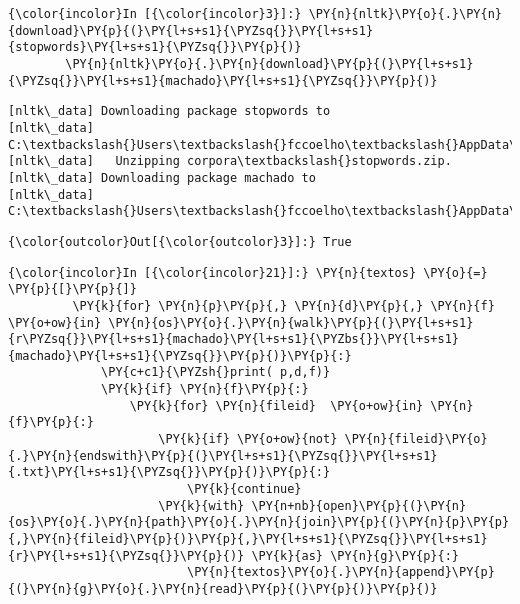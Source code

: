     \begin{Verbatim}[commandchars=\\\{\}]
{\color{incolor}In [{\color{incolor}3}]:} \PY{n}{nltk}\PY{o}{.}\PY{n}{download}\PY{p}{(}\PY{l+s+s1}{\PYZsq{}}\PY{l+s+s1}{stopwords}\PY{l+s+s1}{\PYZsq{}}\PY{p}{)}
        \PY{n}{nltk}\PY{o}{.}\PY{n}{download}\PY{p}{(}\PY{l+s+s1}{\PYZsq{}}\PY{l+s+s1}{machado}\PY{l+s+s1}{\PYZsq{}}\PY{p}{)}
\end{Verbatim}

    \begin{Verbatim}[commandchars=\\\{\}]
[nltk\_data] Downloading package stopwords to
[nltk\_data]     C:\textbackslash{}Users\textbackslash{}fccoelho\textbackslash{}AppData\textbackslash{}Roaming\textbackslash{}nltk\_data{\ldots}
[nltk\_data]   Unzipping corpora\textbackslash{}stopwords.zip.
[nltk\_data] Downloading package machado to
[nltk\_data]     C:\textbackslash{}Users\textbackslash{}fccoelho\textbackslash{}AppData\textbackslash{}Roaming\textbackslash{}nltk\_data{\ldots}

    \end{Verbatim}

            \begin{Verbatim}[commandchars=\\\{\}]
{\color{outcolor}Out[{\color{outcolor}3}]:} True
\end{Verbatim}
        
    \begin{Verbatim}[commandchars=\\\{\}]
{\color{incolor}In [{\color{incolor}21}]:} \PY{n}{textos} \PY{o}{=} \PY{p}{[}\PY{p}{]}
         \PY{k}{for} \PY{n}{p}\PY{p}{,} \PY{n}{d}\PY{p}{,} \PY{n}{f} \PY{o+ow}{in} \PY{n}{os}\PY{o}{.}\PY{n}{walk}\PY{p}{(}\PY{l+s+s1}{r\PYZsq{}}\PY{l+s+s1}{machado}\PY{l+s+s1}{\PYZbs{}}\PY{l+s+s1}{machado}\PY{l+s+s1}{\PYZsq{}}\PY{p}{)}\PY{p}{:}
             \PY{c+c1}{\PYZsh{}print( p,d,f)}
             \PY{k}{if} \PY{n}{f}\PY{p}{:}
                 \PY{k}{for} \PY{n}{fileid}  \PY{o+ow}{in} \PY{n}{f}\PY{p}{:}
                     \PY{k}{if} \PY{o+ow}{not} \PY{n}{fileid}\PY{o}{.}\PY{n}{endswith}\PY{p}{(}\PY{l+s+s1}{\PYZsq{}}\PY{l+s+s1}{.txt}\PY{l+s+s1}{\PYZsq{}}\PY{p}{)}\PY{p}{:}
                         \PY{k}{continue}
                     \PY{k}{with} \PY{n+nb}{open}\PY{p}{(}\PY{n}{os}\PY{o}{.}\PY{n}{path}\PY{o}{.}\PY{n}{join}\PY{p}{(}\PY{n}{p}\PY{p}{,}\PY{n}{fileid}\PY{p}{)}\PY{p}{,}\PY{l+s+s1}{\PYZsq{}}\PY{l+s+s1}{r}\PY{l+s+s1}{\PYZsq{}}\PY{p}{)} \PY{k}{as} \PY{n}{g}\PY{p}{:}
                         \PY{n}{textos}\PY{o}{.}\PY{n}{append}\PY{p}{(}\PY{n}{g}\PY{o}{.}\PY{n}{read}\PY{p}{(}\PY{p}{)}\PY{p}{)}
\end{Verbatim}

